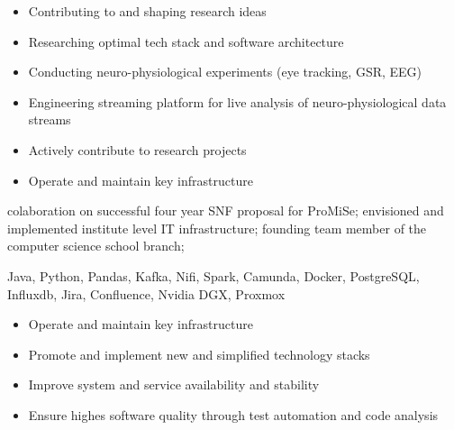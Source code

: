 \documentclass[9pt,a4paper]{altacv}
\begin{document}
\divider

%


\begin{itemize}
\item Contributing to and shaping research ideas
\item Researching optimal tech stack and software architecture
\item Conducting neuro-physiological experiments (eye tracking, GSR, EEG)
\item Engineering streaming platform for live analysis of neuro-physiological data streams
\item Actively contribute to research projects
\item Operate and maintain key infrastructure
\end{itemize}

colaboration on successful four year SNF proposal for ProMiSe;
envisioned and implemented institute level IT infrastructure;
founding team member of the computer science school branch;


Java, Python, Pandas, Kafka, Nifi, Spark, Camunda, Docker, PostgreSQL, Influxdb, Jira, Confluence, Nvidia DGX, Proxmox


\divider

%


\begin{itemize}
  \item Operate and maintain key infrastructure
  \item Promote and implement new and simplified technology stacks
  \item Improve system and service availability and stability
  \item Ensure highes software quality through test automation and code analysis
\end{itemize}
\end{document}
